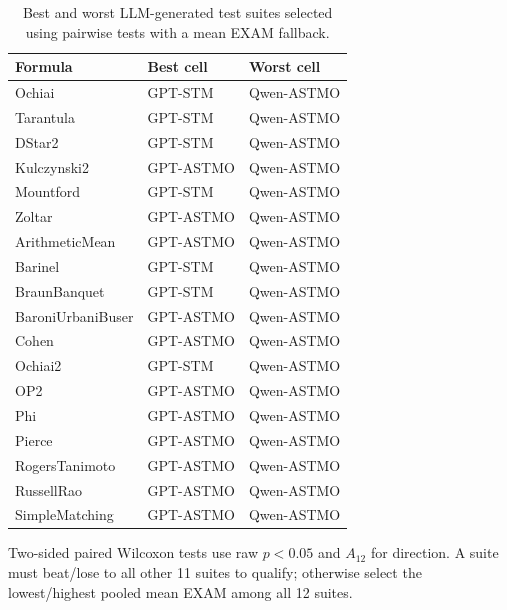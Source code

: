 \begin{table}[t]
\centering
\caption{Best and worst LLM-generated test suites selected using pairwise tests with a mean EXAM fallback.}
\label{tab:rq3bw-selection}
\begin{tabular}{lll}
\hline
Formula & Best cell & Worst cell \\
\hline
Ochiai & GPT-STM & Qwen-ASTMO \\
Tarantula & GPT-STM & Qwen-ASTMO \\
DStar2 & GPT-STM & Qwen-ASTMO \\
Kulczynski2 & GPT-ASTMO & Qwen-ASTMO \\
Mountford & GPT-STM & Qwen-ASTMO \\
Zoltar & GPT-ASTMO & Qwen-ASTMO \\
ArithmeticMean & GPT-ASTMO & Qwen-ASTMO \\
Barinel & GPT-STM & Qwen-ASTMO \\
BraunBanquet & GPT-STM & Qwen-ASTMO \\
BaroniUrbaniBuser & GPT-ASTMO & Qwen-ASTMO \\
Cohen & GPT-ASTMO & Qwen-ASTMO \\
Ochiai2 & GPT-STM & Qwen-ASTMO \\
OP2 & GPT-ASTMO & Qwen-ASTMO \\
Phi & GPT-ASTMO & Qwen-ASTMO \\
Pierce & GPT-ASTMO & Qwen-ASTMO \\
RogersTanimoto & GPT-ASTMO & Qwen-ASTMO \\
RussellRao & GPT-ASTMO & Qwen-ASTMO \\
SimpleMatching & GPT-ASTMO & Qwen-ASTMO \\
\hline
\end{tabular}
\par\smallskip
\begin{minipage}{\linewidth}\footnotesize Two-sided paired Wilcoxon tests use raw $p<0.05$ and $A_{12}$ for direction. A suite must beat/lose to all other 11 suites to qualify; otherwise select the lowest/highest pooled mean EXAM among all 12 suites.
\end{minipage}
\end{table}
